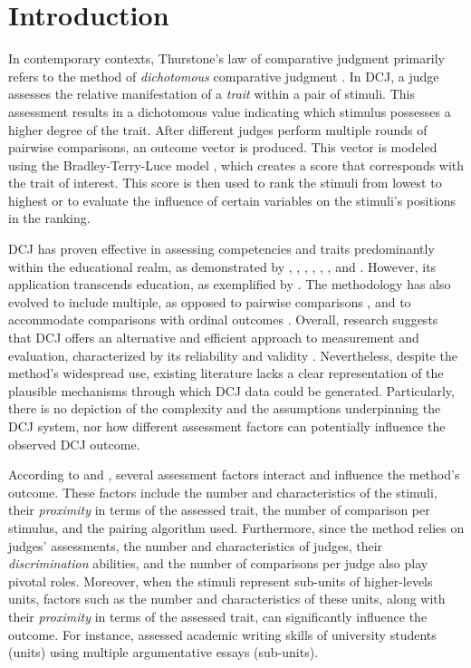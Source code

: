 \documentclass[
  authoryear,
  preprint,
  1p]{elsarticle}
\begin{document}
\section{Introduction}\label{sec-introduction}

In contemporary contexts, Thurstone's law of comparative judgment
\citeyearpar{Thurstone_1927} primarily refers to the method of
\emph{dichotomous} comparative judgment
\citep[DCJ,][]{Pollitt_2012a, Pollitt_2012b}. In DCJ, a judge assesses
the relative manifestation of a \emph{trait} within a pair of stimuli.
This assessment results in a dichotomous value indicating which stimulus
possesses a higher degree of the trait. After different judges perform
multiple rounds of pairwise comparisons, an outcome vector is produced.
This vector is modeled using the Bradley-Terry-Luce model
\citep[BTL,][]{Bradley_et_al_1952, Luce_1959}, which creates a score
that corresponds with the trait of interest. This score is then used to
rank the stimuli from lowest to highest or to evaluate the influence of
certain variables on the stimuli's positions in the ranking.

DCJ has proven effective in assessing competencies and traits
predominantly within the educational realm, as demonstrated by
\citet{Pollitt_2012b}, \citet{Jones_2015}, \citet{vanDaal_et_al_2016},
\citet{Bartholomew_et_al_2018}, \citet{Lesterhuis_2018},
\citet{Bartholomew_et_al_2020}, and \citet{Marshall_et_al_2020}.
However, its application transcends education, as exemplified by
\citet{Boonen_et_al_2020}. The methodology has also evolved to include
multiple, as opposed to pairwise comparisons
\citep{Luce_1959, Placket_1975}, and to accommodate comparisons with
ordinal outcomes \citep{Tutz_1986, Agresti_1992}. Overall, research
suggests that DCJ offers an alternative and efficient approach to
measurement and evaluation, characterized by its reliability and
validity \citep{Lesterhuis_2018, vanDaal_2020, Marshall_et_al_2020}.
Nevertheless, despite the method's widespread use, existing literature
lacks a clear representation of the plausible mechanisms through which
DCJ data could be generated. Particularly, there is no depiction of the
complexity and the assumptions underpinning the DCJ system, nor how
different assessment factors can potentially influence the observed DCJ
outcome.

According to \citet{Verhavert_et_al_2019} and \citet{vanDaal_2020},
several assessment factors interact and influence the method's outcome.
These factors include the number and characteristics of the stimuli,
their \emph{proximity} in terms of the assessed trait, the number of
comparison per stimulus, and the pairing algorithm used. Furthermore,
since the method relies on judges' assessments, the number and
characteristics of judges, their \emph{discrimination} abilities, and
the number of comparisons per judge also play pivotal roles. Moreover,
when the stimuli represent sub-units of higher-levels units, factors
such as the number and characteristics of these units, along with their
\emph{proximity} in terms of the assessed trait, can significantly
influence the outcome. For instance, \citet{vanDaal_et_al_2016} assessed
academic writing skills of university students (units) using multiple
argumentative essays (sub-units).
\end{document}
